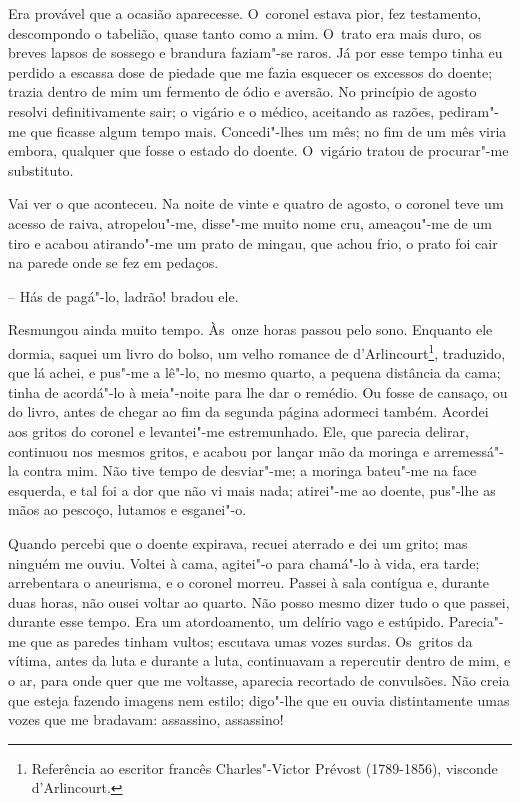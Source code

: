 Era provável que a ocasião aparecesse. O~coronel estava pior, fez
testamento, descompondo o tabelião, quase tanto como a mim. O~trato era
mais duro, os breves lapsos de sossego e brandura faziam"-se raros. Já
por esse tempo tinha eu perdido a escassa dose de piedade que me fazia
esquecer os excessos do doente; trazia dentro de mim um fermento de ódio
e aversão. No princípio de agosto resolvi definitivamente sair; o
vigário e o médico, aceitando as razões, pediram"-me que ficasse algum
tempo mais. Concedi"-lhes um mês; no fim de um mês viria embora, qualquer
que fosse o estado do doente. O~vigário tratou de procurar"-me
substituto.

Vai ver o que aconteceu. Na noite de vinte e quatro de agosto, o coronel
teve um acesso de raiva, atropelou"-me, disse"-me muito nome cru,
ameaçou"-me de um tiro e acabou atirando"-me um prato de mingau, que achou
frio, o prato foi cair na parede onde se fez em pedaços.

-- Hás de pagá"-lo, ladrão! bradou ele.

Resmungou ainda muito tempo. Às~onze horas passou pelo sono. Enquanto
ele dormia, saquei um livro do bolso, um velho romance de
d'Arlincourt\footnote{Referência ao escritor francês Charles"-Victor
  Prévost (1789-1856), visconde d'Arlincourt.}, traduzido, que lá achei,
e pus"-me a lê"-lo, no mesmo quarto, a pequena distância da cama; tinha de
acordá"-lo à meia"-noite para lhe dar o remédio. Ou fosse de cansaço, ou
do livro, antes de chegar ao fim da segunda página adormeci também.
Acordei aos gritos do coronel e levantei"-me estremunhado. Ele, que
parecia delirar, continuou nos mesmos gritos, e acabou por lançar mão da
moringa e arremessá"-la contra mim. Não tive tempo de desviar"-me; a
moringa bateu"-me na face esquerda, e tal foi a dor que não vi mais nada;
atirei"-me ao doente, pus"-lhe as mãos ao pescoço, lutamos e esganei"-o.

Quando percebi que o doente expirava, recuei aterrado e dei um grito;
mas ninguém me ouviu. Voltei à cama, agitei"-o para chamá"-lo à vida, era
tarde; arrebentara o aneurisma, e o coronel morreu. Passei à sala
contígua e, durante duas horas, não ousei voltar ao quarto. Não posso
mesmo dizer tudo o que passei, durante esse tempo. Era um atordoamento,
um delírio vago e estúpido. Parecia"-me que as paredes tinham vultos;
escutava umas vozes surdas. Os~gritos da vítima, antes da luta e durante
a luta, continuavam a repercutir dentro de mim, e o ar, para onde quer
que me voltasse, aparecia recortado de convulsões. Não creia que esteja
fazendo imagens nem estilo; digo"-lhe que eu ouvia distintamente umas
vozes que me bradavam: assassino, assassino!

